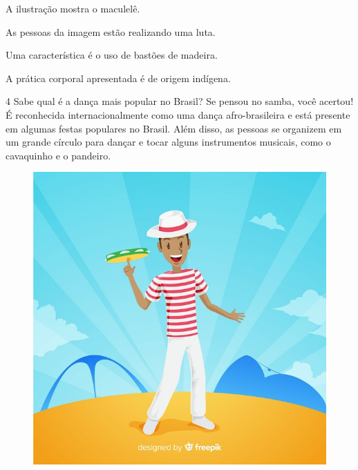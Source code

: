 \begin{boxlist}
\item A ilustração mostra o maculelê. 

\item As pessoas da imagem estão realizando uma luta. 

\item Uma característica é o uso de bastões de madeira. 

\item A prática corporal apresentada é de origem indígena. 
\end{boxlist}


\num{4} Sabe qual é a dança mais popular no Brasil? Se pensou no samba, você
  acertou! É reconhecida internacionalmente como uma dança
  afro-brasileira e está presente em algumas festas populares no Brasil.
  Além disso, as pessoas se organizem em um grande círculo para dançar e
  tocar alguns instrumentos musicais, como o cavaquinho e o pandeiro.

\begin{figure}[htpb!]
\includegraphics[width=\textwidth]{./imgs/img13.jpg}
\end{figure}

